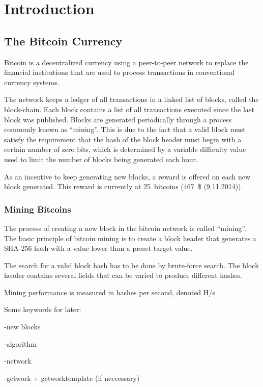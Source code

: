 \chapter{Introduction}

\section{The Bitcoin Currency}
Bitcoin is a decentralized currency using a peer-to-peer network to replace
the financial institutions that are used to process transactions in conventional
currency systems.

The network keeps a ledger of all transactions in a linked list of blocks, called the
block-chain. Each block contains a list of all transactions executed since the last
block was published. Blocks are generated periodically through a process
commonly known as ``mining''. This is due to the fact that a valid block must satisfy
the requirement that the hash of the block header must begin with a certain number of
zero bits, which is determined by a variable difficulty value used to limit the number
of blocks being generated each hour\cite{bitcoin}.

As an incentive to keep generating new blocks, a reward is offered on each new block
generated. This reward is currently at 25~bitcoins (467~\$ (9.11.2014)).


\subsection{Mining Bitcoins}
The process of creating a new block in the bitcoin network is called ``mining''. The basic
principle of bitcoin mining is to create a block header that generates a SHA-256 hash with
a value lower than a preset target value.

The search for a valid block hash has to be done by brute-force search. The block header
contains several fields that can be varied to produce different hashes.

Mining performance is measured in hashes per second, denoted H/s.

Some keywords for later:

-new blocks

-algorithm

-network

-getwork + getworktemplate (if neccessary)

